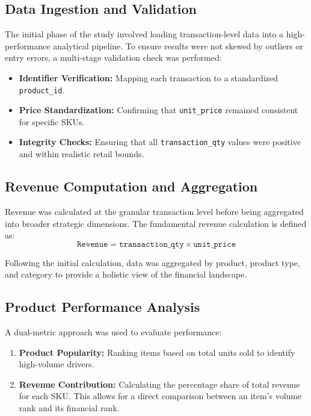 \documentclass[12pt, a4paper]{article}
\begin{document}
	\subsection{Data Ingestion and Validation}
	The initial phase of the study involved loading transaction-level data into a high-performance analytical pipeline. To ensure results were not skewed by outliers or entry errors, a multi-stage validation check was performed:
	\begin{itemize}
		\item \textbf{Identifier Verification:} Mapping each transaction to a standardized \texttt{product\_id}.
		\item \textbf{Price Standardization:} Confirming that \texttt{unit\_price} remained consistent for specific SKUs.
		\item \textbf{Integrity Checks:} Ensuring that all \texttt{transaction\_qty} values were positive and within realistic retail bounds.
	\end{itemize}
	
	\subsection{Revenue Computation and Aggregation}
	Revenue was calculated at the granular transaction level before being aggregated into broader strategic dimensions. The fundamental revenue calculation is defined as:
	\begin{equation}
		\texttt{Revenue} = \texttt{transaction\_qty} \times \texttt{unit\_price}
	\end{equation}
	
	Following the initial calculation, data was aggregated by product, product type, and category to provide a holistic view of the financial landscape.
	
	\subsection{Product Performance Analysis}
	A dual-metric approach was used to evaluate performance:
	\begin{enumerate}
		\item \textbf{Product Popularity:} Ranking items based on total units sold to identify high-volume drivers.
		\item \textbf{Revenue Contribution:} Calculating the percentage share of total revenue for each SKU. This allows for a direct comparison between an item's volume rank and its financial rank.
	\end{enumerate}
	
\end{document}

